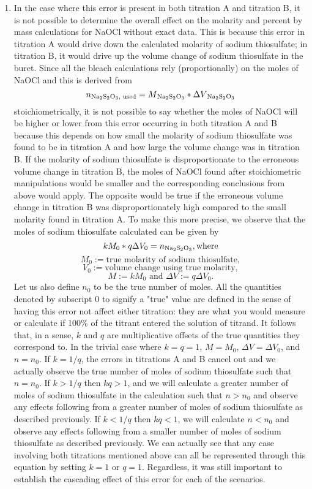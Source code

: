 \documentclass[11pt]{article} %
\begin{document}
\begin{enumerate}
\begin{enumerate}
		\item In the case where this error is present in both titration A and titration B, it is not possible to determine the overall effect on the molarity and percent by mass calculations for NaOCl without exact data. This is because this error in titration A would drive down the calculated molarity of sodium thiosulfate; in titration B, it would drive up the volume change of sodium thiosulfate in the buret. Since all the bleach calculations rely (proportionally) on the moles of NaOCl and this is derived from $$n\textsubscript{Na\textsubscript{2}S\textsubscript{2}O\textsubscript{3}, used} = M\textsubscript{Na\textsubscript{2}S\textsubscript{2}O\textsubscript{3}} * \Delta V\textsubscript{Na\textsubscript{2}S\textsubscript{2}O\textsubscript{3}}$$ stoichiometrically, it is not possible to say whether the moles of NaOCl will be higher or lower from this error occurring in both titration A and B because this depends on how small the molarity of sodium thiosulfate was found to be in titration A and how large the volume change was in titration B. If the molarity of sodium thiosulfate is disproportionate to the erroneous volume change in titration B, the moles of NaOCl found after stoichiometric manipulations would be smaller and the corresponding conclusions from above would apply. The opposite would be true if the erroneous volume change in titration B was disproportionately high compared to the small molarity found in titration A. To make this more precise, we observe that the moles of sodium thiosulfate calculated can be given by
$$kM_0 * q\Delta V_0 = n\textsubscript{Na\textsubscript{2}S\textsubscript{2}O\textsubscript{3}}, \textrm{where}$$ $$M_0 := \textrm{true molarity of sodium thiosulfate},$$ $$V_0 := \textrm{volume change using true molarity},$$ $$ M := kM_0 \textrm{ and } \Delta V :=  q\Delta V_0.$$
Let us also define $n_0$ to be the true number of moles. All the quantities denoted by subscript $0$ to signify a "true" value are defined in the sense of having this error not affect either titration: they are what you would measure or calculate if 100\% of the titrant entered the solution of titrand. It follows that, in a sense, $k$ and $q$ are multiplicative offsets of the true quantities they correspond to. In the trivial case where $k = q = 1$, $M = M_0$, $\Delta V = \Delta V_0$, and $n = n_0$. If $k = 1/q$, the errors in titrations A and B cancel out and we actually observe the true number of moles of sodium thiosulfate such that $n = n_0$. If $k > 1/q$ then $kq > 1$, and we will calculate a greater number of moles of sodium thiosulfate in the calculation such that $n > n_0$ and observe any effects following from a greater number of moles of sodium thiosulfate as described previously. If $k < 1/q$ then $kq < 1$, we will calculate $n < n_0$ and observe any effects following from a smaller number of moles of sodium thiosulfate as described previously. We can actually see that any case involving both titrations mentioned above can all be represented through this equation by setting $k = 1$ or $q = 1$. Regardless, it was still important to establish the cascading effect of this error for each of the scenarios.
	\end{enumerate}
\end{enumerate}
\end{document}
